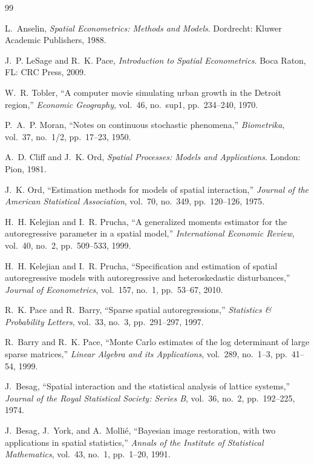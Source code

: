 \documentclass[conference]{IEEEtran}
\theoremstyle{definition}
\begin{document}

\begin{thebibliography}{99}

L.~Anselin, \emph{Spatial Econometrics: Methods and Models}. Dordrecht: Kluwer Academic Publishers, 1988.

J.~P. LeSage and R.~K. Pace, \emph{Introduction to Spatial Econometrics}. Boca Raton, FL: CRC Press, 2009.

W.~R. Tobler, ``A computer movie simulating urban growth in the Detroit region,'' \emph{Economic Geography}, vol.~46, no.~sup1, pp.~234--240, 1970.

P.~A.~P. Moran, ``Notes on continuous stochastic phenomena,'' \emph{Biometrika}, vol.~37, no.~1/2, pp.~17--23, 1950.

A.~D. Cliff and J.~K. Ord, \emph{Spatial Processes: Models and Applications}. London: Pion, 1981.

J.~K. Ord, ``Estimation methods for models of spatial interaction,'' \emph{Journal of the American Statistical Association}, vol.~70, no.~349, pp.~120--126, 1975.

H.~H. Kelejian and I.~R. Prucha, ``A generalized moments estimator for the autoregressive parameter in a spatial model,'' \emph{International Economic Review}, vol.~40, no.~2, pp.~509--533, 1999.

H.~H. Kelejian and I.~R. Prucha, ``Specification and estimation of spatial autoregressive models with autoregressive and heteroskedastic disturbances,'' \emph{Journal of Econometrics}, vol.~157, no.~1, pp.~53--67, 2010.

R.~K. Pace and R.~Barry, ``Sparse spatial autoregressions,'' \emph{Statistics \& Probability Letters}, vol.~33, no.~3, pp.~291--297, 1997.

R.~Barry and R.~K. Pace, ``Monte Carlo estimates of the log determinant of large sparse matrices,'' \emph{Linear Algebra and its Applications}, vol.~289, no.~1--3, pp.~41--54, 1999.

J.~Besag, ``Spatial interaction and the statistical analysis of lattice systems,'' \emph{Journal of the Royal Statistical Society: Series B}, vol.~36, no.~2, pp.~192--225, 1974.

J.~Besag, J.~York, and A.~Molli\'e, ``Bayesian image restoration, with two applications in spatial statistics,'' \emph{Annals of the Institute of Statistical Mathematics}, vol.~43, no.~1, pp.~1--20, 1991.


\end{thebibliography}
\end{document}
